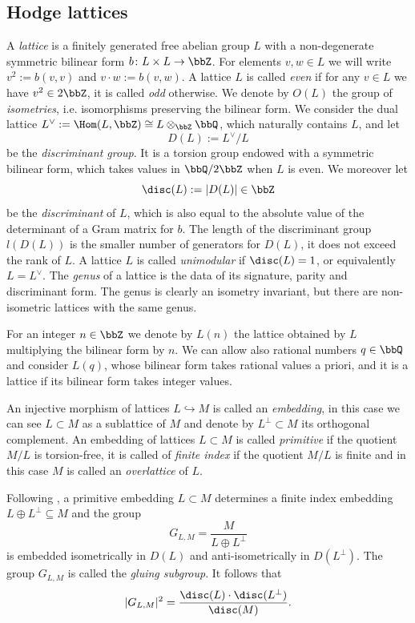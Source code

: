 \documentclass{amsart}
\begin{document}
\subsection{Hodge lattices}
A \textit{lattice} is a finitely generated free abelian group \(L\) with a non-degenerate symmetric bilinear form \(b\colon L\times L\to \bbZ\). For elements \(v,w\in L\) we will write \(v^2:=b(v,v)\) and \(v\cdot w:=b(v,w)\). A lattice \(L\) is called \textit{even} if for any \(v\in L\) we have \(v^2\in 2\bbZ\), it is called \textit{odd} otherwise. We denote by \(O(L)\) the group of \textit{isometries}, i.e. isomorphisms preserving the bilinear form. We consider the dual lattice \(L^\vee:=\Hom(L,\bbZ)\cong L\otimes_\bbZ\bbQ\), which naturally contains \(L\), and let \[D(L):=L^\vee/L\] be the \textit{discriminant group}. It is a torsion group endowed with a symmetric bilinear form, which takes values in \(\bbQ/2\bbZ\) when \(L\) is even. We moreover let 
\[\disc(L):=|D(L)|\in \bbZ\]
be the \textit{discriminant} of \(L\), which is also equal to the absolute value of the determinant of a Gram matrix for \(b\). The length of the discriminant group \(l(D(L))\) is the smaller number of generators for \(D(L)\), it does not exceed the rank of \(L\). A lattice \(L\) is called \textit{unimodular} if \(\disc (L)=1\), or equivalently \(L=L^\vee\). 
The \textit{genus} of a lattice is the data of its signature, parity and discriminant form. The genus is clearly an isometry invariant, but there are non-isometric lattices with the same genus.

For an integer \(n\in \bbZ\) we denote by \(L(n)\) the lattice obtained by \(L\) multiplying the bilinear form by \(n\). We can allow also rational numbers \(q\in \bbQ\) and consider \(L(q)\), whose bilinear form takes rational values a priori, and it is a lattice if its bilinear form takes integer values. 

An injective morphism of lattices \(L\hookrightarrow M\) is called an \textit{embedding}, in this case we can see \(L\subset M\) as a sublattice of \(M\) and denote by \(L^\perp\subset M\) its orthogonal complement. An embedding of lattices \(L\subset M\) is called \textit{primitive} if the quotient \(M/L\) is torsion-free, it is called of \textit{finite index} if the quotient \(M/L\) is finite and in this case \(M\) is called an \textit{overlattice} of \(L\).

Following \cite{Nikulin_integral}, a primitive embedding \(L\subset M\) determines a finite index embedding \(L\oplus L^\perp \subseteq M\) and the group
\[G_{L,M}=\frac{M}{L\oplus L^\perp}\]
is embedded isometrically in \(D(L)\) and anti-isometrically in \(D({L^\perp})\). The group \(G_{L,M}\) is called the \textit{gluing subgroup}. It follows that 
\begin{equation}\label{eq:order_glueing}
    |G_{L,M}|^2=\frac{\disc(L)\cdot \disc(L^\perp)}{\disc(M)}.
\end{equation}
\end{document}
